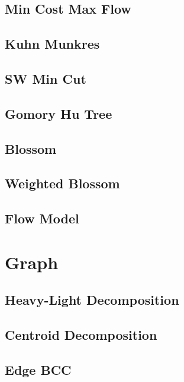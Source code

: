 \subsection{Min Cost Max Flow}

\subsection{Kuhn Munkres}
\subsection{SW Min Cut}
\subsection{Gomory Hu Tree}
\subsection{Blossom}
\subsection{Weighted Blossom}
\subsection{Flow Model}


\section{Graph}
\subsection{Heavy-Light Decomposition}

\subsection{Centroid Decomposition}

\subsection{Edge BCC}

